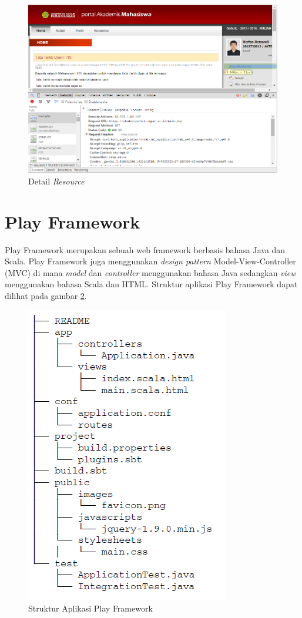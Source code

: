 \begin{figure}
	\centering
	\includegraphics[scale=0.5]{Gambar/network-name}
	\caption{Detail \textit{Resource}} 
	\label{fig:2_network_detail}
\end{figure}

\section{Play Framework}
\label{sec:play}

Play Framework\cite{Leroux:2014} merupakan sebuah web framework berbasis bahasa Java dan Scala. Play Framework juga menggunakan \textit{design pattern} Model-View-Controller (MVC) di mana \textit{model} dan \textit{controller} menggunakan bahasa Java sedangkan \textit{view} menggunakan bahasa Scala dan HTML. Struktur aplikasi Play Framework dapat dilihat pada gambar \ref{fig:2_play_dir}.
\begin{figure}[H]
	\centering
	\includegraphics[scale=0.5]{Gambar/play-dir}
	\caption{Struktur Aplikasi Play Framework} 
	\label{fig:2_play_dir}
\end{figure}

